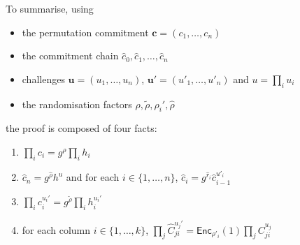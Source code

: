 \documentclass[12pt,a4paper]{article}
\theoremstyle{definition}
\begin{document}
To summarise, using
\begin{itemize}
    \item the permutation commitment $\mathbf{c}=(c_1,\ldots,c_n)$
    \item the commitment chain $\hat{c}_0, \hat{c}_1, \ldots, \hat{c}_n$
    \item challenges $\mathbf{u}=(u_1,\ldots,u_n)$, $\mathbf{u}'=(u'_1,\ldots,u'_n)$ and $u=\prod_i u_i$
    \item the randomisation factors $\rho, \tilde{\rho}, \rho_i', \hat{\rho}$
\end{itemize}
the proof is composed of four facts:
\begin{enumerate}
    \item $\prod_i c_i = g^\rho\prod_i h_i$
    \item $\hat{c}_n = g^{\hat{\rho}} h^{u}$ and for each $i\in\{1,\ldots, n\}$, $\hat{c}_i = g^{\hat{r}_i}\hat{c}_{i-1}^{u'_i}$
    \item $\prod_i c_i^{u_i'} = g^{\tilde{\rho}} \prod_i h_i^{u_i'}$
    \item for each column $i\in\{1,\ldots, k\}$, $\prod_j \hat{C}_{ji}^{u_j'} = \mathsf{Enc}_{\rho'_i}(1)\prod_j C_{ji}^{u_j}$
\end{enumerate}
\end{document}

